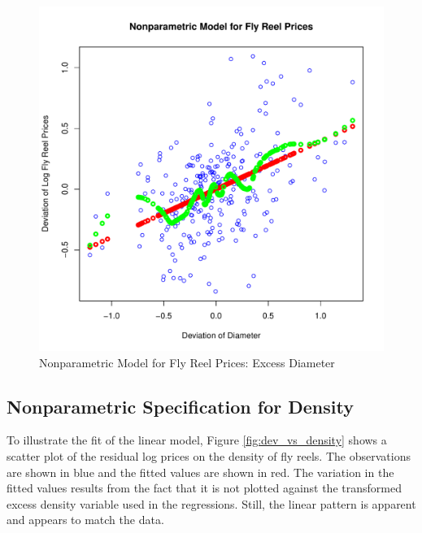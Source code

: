 \begin{figure}[h!]
  \centering
  \includegraphics[scale = 0.5, keepaspectratio=true]{../Figures/dev_np_vs_diameter_dev}
  \caption{Nonparametric Model for Fly Reel Prices: Excess Diameter} \label{fig:dev_np_vs_diameter_dev}
\end{figure}



\clearpage
\subsection{Nonparametric Specification for Density}

To illustrate the fit of the linear model, 
Figure \ref{fig:dev_vs_density} shows a scatter plot 
of the residual log prices on 
the density of fly reels. 
The observations are shown in blue
and the fitted values are shown in red.
The variation in the fitted values results from the 
fact that it is not plotted against the transformed 
excess density variable 
used in the regressions.
Still, the linear pattern is apparent
and appears to match the data. 

